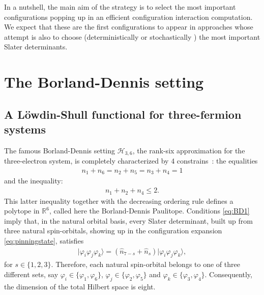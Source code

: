 \documentclass[aps,twocolumn,showpacs,pra,superscriptaddress,floatfix,longbibliography]{revtex4-1}
\newcommand{\R}{{\mathbb{R}}}
\newcommand{\7}{\dagger}
\newcommand{\ket}[1]{\mbox{$| #1 \rangle$}}
\renewcommand{\H}{\mathcal{H}}
\begin{document}
 In a nutshell, the main aim of the strategy is to select the most 
 important configurations popping up in an efficient configuration  
 interaction computation. We expect that these are the first 
 configurations to appear in approaches whose attempt is also 
 to choose (deterministically \cite{Cleland} or stochastically \cite{Caffarel,CaffarelI}) the most important Slater determinants.
 
\section{The Borland-Dennis setting}
\label{sec:SL}

\subsection{A L\"owdin-Shull functional for three-fermion systems}

The famous Bor\-land-Dennis setting $\H_{3,6}$, 
the rank-six approximation for the three-electron system,
is completely characterized by 4 constrains~\cite{Borl1972}: 
the equalities 
\begin{align}
n_{1} + n_{6} = n_{2} + n_{5} = 
n_{3} + n_{4} = 1
  \label{eq:BD1}
\end{align}
 and the inequality:
\begin{align}
  n_{1} + n_{2} + n_{4} \leq 2 . 
  \label{eq:BD2}
\end{align}
This latter inequality together with the decreasing
ordering rule defines a polytope in $\R^6$, called here the 
Borland-Dennis Paulitope. 
Conditions   \eqref{eq:BD1} imply that, in the natural orbital 
basis, every Slater determinant, built up from three natural 
spin-orbitals, showing up in the configuration 
expansion \eqref{eq:pinningstate}, satisfies  
\begin{align}
\ket{\varphi_i\varphi_j\varphi_k} =
(\hat n_{7-s} + \hat n_{s})\ket{\varphi_i\varphi_j\varphi_k},
\end{align}
for $s\in\{1,2,3\}$.
Therefore, each natural spin-orbital belongs 
to one of three different sets, say
$\varphi_i \in \{\varphi_1,\varphi_6\}$, 
$\varphi_j \in \{\varphi_2,\varphi_5\}$ and
$\varphi_k \in \{\varphi_3,\varphi_4\}$. 
Consequently, the dimension of the total Hilbert 
space is eight.
\end{document}
